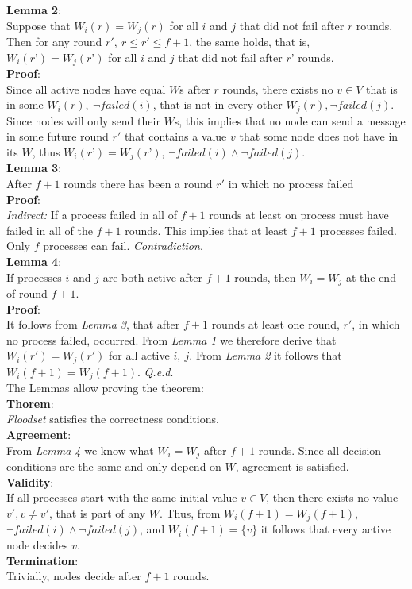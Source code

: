 \documentclass[fleqn]{article}
\begin{document}
\noindent \textbf{Lemma 2}:\\
Suppose that $W_i(r) = W_j(r)$ for all $i$ and $j$ that did not fail after $r$ rounds. Then for any round $r',\ r \le r' ≤ f + 1$, the same holds, that is, $W_i(r’) = W_j(r’)$ for all $i$ and $j$ that did not fail after $r’$ rounds.\\
\textbf{Proof}:\\
Since all active nodes have equal $W$s after $r$ rounds, there exists no $v \in V$ that is in some $W_i(r),\ \neg failed(i)$, that is not in every other $W_j(r), \neg failed(j)$.
Since nodes will only send their $W$s, this implies that no node can send a message in some future round $r'$ that contains a value $v$ that some node does not have in its $W$, thus $W_i(r’) = W_j(r’)$, $\neg failed(i) \land \neg failed(j)$.\\

\noindent \textbf{Lemma 3}:\\
After $f+1$ rounds there has been a round $r'$ in which no process failed\\
\textbf{Proof}:\\
\textit{Indirect:} If a process failed in all of $f+1$ rounds at least on process must have failed in all of the $f+1$ rounds. This implies
that at least $f+1$ processes failed. Only $f$ processes can fail. \textit{Contradiction}.\\


\noindent \textbf{Lemma 4}:\\
If processes $i$ and $j$ are both active after $f+1$ rounds, then $W_i = W_j$ at the end of round $f + 1$.\\
\textbf{Proof}:\\
It follows from \textit{Lemma 3}, that after $f+1$ rounds at least one round, $r'$, in which no process failed, occurred. From \textit{Lemma 1} we therefore derive that $W_i(r') = W_j(r')$ for all active $i,\ j$.
From \textit{Lemma 2} it follows that $W_i(f+1) = W_j(f+1)$. \textit{Q.e.d}.\\

\noindent The Lemmas allow proving the theorem:\\
\noindent \textbf{Thorem}:\\
\textit{Floodset} satisfies the correctness conditions.\\
\textbf{Agreement}:\\
From \textit{Lemma 4} we know what $W_i = W_j$ after $f+1$ rounds. Since all decision conditions are the same and only depend on $W$, agreement is satisfied.\\
\textbf{Validity}:\\
If all processes start with the same initial value $v \in V$, then there exists no value $v', v \neq v'$, that is part of any $W$. Thus, from $W_i(f+1) = W_j(f+1)$, $\neg failed(i) \land \neg failed(j)$, and $W_i(f+1) = \{v\}$ it follows
that every active node decides $v$.\\
\textbf{Termination}:\\
Trivially, nodes decide after $f+1$ rounds.\\
\end{document}
